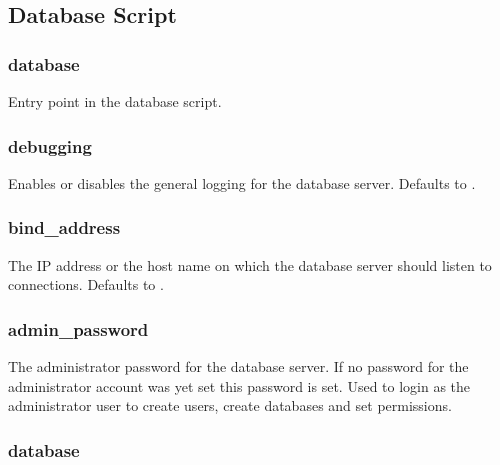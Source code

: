 \subsection{Database Script}

\subsubsection{database}


Entry point in the database script.

\subsubsection{debugging}


Enables or disables the general logging for the database server.
Defaults to \literalfalse.

\subsubsection{bind\_address}


The IP address or the host name on which the database server should listen
to connections. Defaults to .

\subsubsection{admin\_password}


The administrator password for the database server. If no password for
the administrator account was yet set this password is set. Used to login as
the administrator user to create users, create databases and set permissions.

\subsubsection{database}

\\
\\
\\

